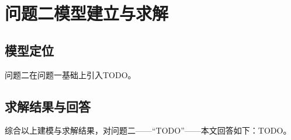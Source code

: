 \section{问题二模型建立与求解}

\subsection{模型定位}

问题二在问题一基础上引入TODO。

\subsection{求解结果与回答}

综合以上建模与求解结果，对问题二——``TODO''——本文回答如下：TODO。
